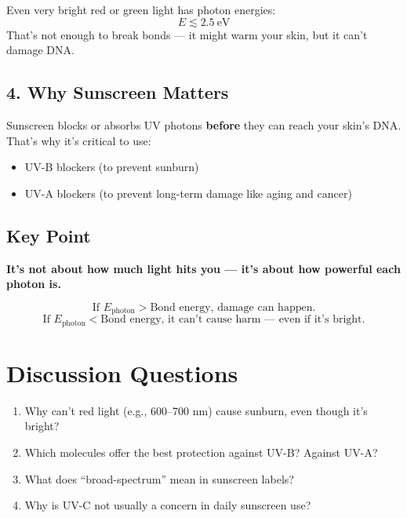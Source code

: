 \documentclass[12pt]{article}
\begin{document}
Even very bright red or green light has photon energies:
\[
E \lesssim 2.5\ \text{eV}
\]
That’s not enough to break bonds — it might warm your skin, but it can’t damage DNA.

\subsection*{4. Why Sunscreen Matters}

Sunscreen blocks or absorbs UV photons \textbf{before} they can reach your skin’s DNA. That’s why it’s critical to use:
\begin{itemize}
    \item UV-B blockers (to prevent sunburn)
    \item UV-A blockers (to prevent long-term damage like aging and cancer)
\end{itemize}

\subsection*{Key Point}

\textbf{It’s not about how much light hits you — it’s about how powerful each photon is.}

\[
\text{If } E_\text{photon} > \text{Bond energy, damage can happen.}
\]
\[
\text{If } E_\text{photon} < \text{Bond energy, it can't cause harm — even if it's bright.}
\]

\section*{Discussion Questions}

\begin{enumerate}
    \item Why can't red light (e.g., 600–700 nm) cause sunburn, even though it's bright?
    \item Which molecules offer the best protection against UV-B? Against UV-A?
    \item What does “broad-spectrum” mean in sunscreen labels?
    \item Why is UV-C not usually a concern in daily sunscreen use?
\end{enumerate}
\end{document}
